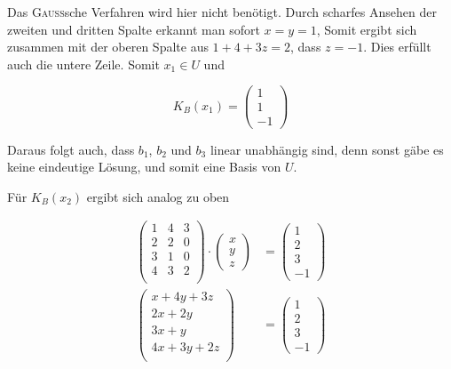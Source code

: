 \documentclass[a4paper,german,12pt,smallheadings]{scrartcl}
\begin{document}
Das \textsc{Gauß}sche Verfahren wird hier nicht benötigt. Durch scharfes
Ansehen der zweiten und dritten Spalte erkannt man sofort $x = y = 1$, Somit
ergibt sich zusammen mit der oberen Spalte aus $1 + 4 + 3z = 2$, dass $z = -1$.
Dies erfüllt auch die untere Zeile. Somit $x_1 \in U$ und

\begin{equation*}
  K_B(x_1) = \begin{pmatrix} 1 \\ 1 \\ -1 \end{pmatrix}
\end{equation*}

Daraus folgt auch, dass $b_1$, $b_2$ und $b_3$ linear unabhängig sind, denn
sonst gäbe es keine eindeutige Lösung, und somit eine Basis von $U$.

Für $K_B(x_2)$ ergibt sich analog zu oben

\begin{align*}
  \begin{pmatrix}
     1 & 4 & 3 \\
     2 & 2 & 0 \\
     3 & 1 & 0 \\
     4 & 3 & 2 \\
  \end{pmatrix}
  \cdot
  \begin{pmatrix}
    x \\
    y \\
    z
  \end{pmatrix}
  &=
  \begin{pmatrix}
    1 \\
    2 \\
    3 \\
    -1
  \end{pmatrix} \\
  \begin{pmatrix}
     x + 4y + 3z \\
     2x + 2y \\
     3x + y \\
     4x + 3y + 2z \\
  \end{pmatrix}
  &=
  \begin{pmatrix}
    1 \\
    2 \\
    3 \\
    -1
  \end{pmatrix}
\end{align*}
\end{document}

